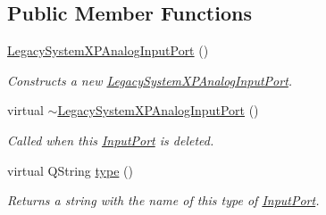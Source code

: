 \subsection*{Public Member Functions}
\begin{DoxyCompactItemize}
\item 
\hypertarget{class_picto_1_1_legacy_system_x_p_analog_input_port_a24f69bafd4a2601a5018956547762b71}{\hyperlink{class_picto_1_1_legacy_system_x_p_analog_input_port_a24f69bafd4a2601a5018956547762b71}{Legacy\-System\-X\-P\-Analog\-Input\-Port} ()}\label{class_picto_1_1_legacy_system_x_p_analog_input_port_a24f69bafd4a2601a5018956547762b71}

\begin{DoxyCompactList}\small\item\em Constructs a new \hyperlink{class_picto_1_1_legacy_system_x_p_analog_input_port}{Legacy\-System\-X\-P\-Analog\-Input\-Port}. \end{DoxyCompactList}\item 
virtual \hyperlink{class_picto_1_1_legacy_system_x_p_analog_input_port_a316f1a839eefb91fbf6b4b346eeb6351}{$\sim$\-Legacy\-System\-X\-P\-Analog\-Input\-Port} ()
\begin{DoxyCompactList}\small\item\em Called when this \hyperlink{class_picto_1_1_input_port}{Input\-Port} is deleted. \end{DoxyCompactList}\item 
\hypertarget{class_picto_1_1_legacy_system_x_p_analog_input_port_aabf69d49f4fd9b0ed5b557a9dff431c3}{virtual Q\-String \hyperlink{class_picto_1_1_legacy_system_x_p_analog_input_port_aabf69d49f4fd9b0ed5b557a9dff431c3}{type} ()}\label{class_picto_1_1_legacy_system_x_p_analog_input_port_aabf69d49f4fd9b0ed5b557a9dff431c3}

\begin{DoxyCompactList}\small\item\em Returns a string with the name of this type of \hyperlink{class_picto_1_1_input_port}{Input\-Port}. \end{DoxyCompactList}\end{DoxyCompactItemize}
